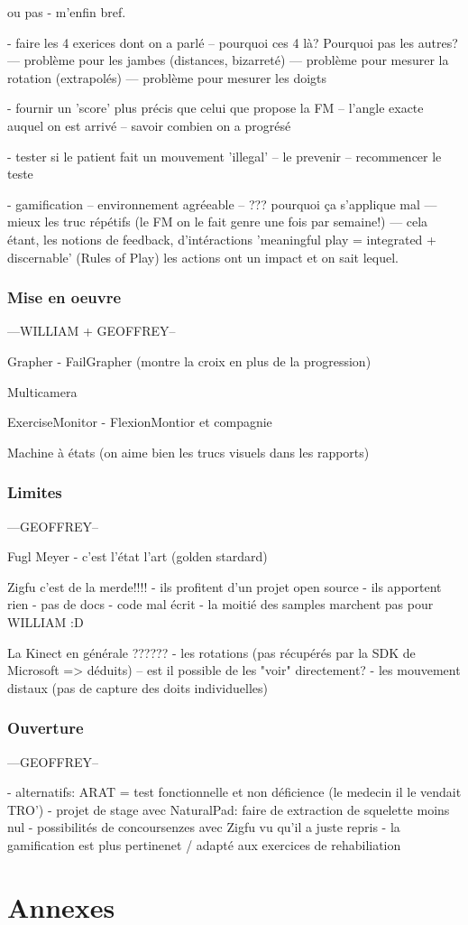 \documentclass{report}
\begin{document}
		ou pas - m'enfin bref.
		
		- faire les 4 exerices dont on a parlé
		-- pourquoi ces 4 là? Pourquoi pas les autres?
		--- problème pour les jambes (distances, bizarreté)
		--- problème pour mesurer la rotation (extrapolés)
		--- problème pour mesurer les doigts 
		
		- fournir un 'score' plus précis que celui que propose la FM
		-- l'angle exacte auquel on est arrivé
		-- savoir combien on a progrésé
		
		- tester si le patient fait un mouvement 'illegal'
		-- le prevenir
		-- recommencer le teste
		
		
		- gamification
		-- environnement agréeable
		-- ??? pourquoi ça s'applique mal
		--- mieux les truc répétifs (le FM on le fait genre une fois par semaine!)
		--- cela étant, les notions de feedback, d'intéractions 
			'meaningful play = integrated + discernable' (Rules of Play) les actions ont un 
			impact et on sait lequel. 
		
		\section{Mise en oeuvre} 		---WILLIAM + GEOFFREY--

		Grapher
		- FailGrapher (montre la croix en plus de la progression)
		
		Multicamera
		
		ExerciseMonitor
		- FlexionMontior et compagnie
		
		Machine à états (on aime bien les trucs visuels dans les rapports)
		
		\section{Limites}		---GEOFFREY--
		
		Fugl Meyer
		- c'est l'état l'art (golden stardard)
		
		Zigfu c'est de la merde!!!!
		- ils profitent d'un projet open source
		- ils apportent rien
		- pas de docs
		- code mal écrit
		- la moitié des samples marchent pas pour WILLIAM :D
		
		La Kinect en générale ??????
		- les rotations (pas récupérés par la SDK de Microsoft => déduits)
		  -- est il possible de les "voir" directement?
		- les mouvement distaux (pas de capture des doits individuelles)
		
		\section{Ouverture}		---GEOFFREY--
		
		- alternatifs: ARAT = test fonctionnelle et non déficience (le medecin il le vendait TRO')
		- projet de stage avec NaturalPad: faire de extraction de squelette moins nul
		- possibilités de concoursenzes avec Zigfu vu qu'il a juste repris 
		- la gamification est plus pertinenet / adapté aux exercices de rehabiliation 
		
\part{Annexes}
\end{document}
